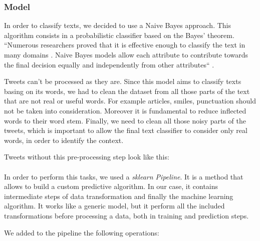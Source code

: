 \subsubsection{Model}
In order to classify texts, we decided to use a Naive Bayes approach. This algorithm consists in a probabilistic classifier based on the Bayes' theorem. ``Numerous researchers proved that it is effective enough to classify the text in many domains \cite{svm}. Naive Bayes models allow each attribute to contribute towards the final decision equally and independently from other attributes`` \cite{nb}.

Tweets can't be processed as they are. Since this model aims to classify texts basing on its words, we had to clean the dataset from all those parts of the text that are not real or useful words. For example articles, smiles, punctuation should not be taken into consideration. Moreover it is fundamental to reduce inflected words to their word stem. Finally, we need to clean all those noisy parts of the tweets, which is important to allow the final text classifier to consider only real words, in order to identify the context.

Tweets without this pre-processing step look like this:\\

\\

In order to perform this tasks, we used a \textit{sklearn Pipeline}. It is a method that allows to build a custom predictive algorithm. In our case, it contains intermediate steps of data transformation and finally the machine learning algorithm. It works like a generic model, but it perform all the included transformations before processing a data, both in training and prediction steps.

We added to the pipeline the following operations:

